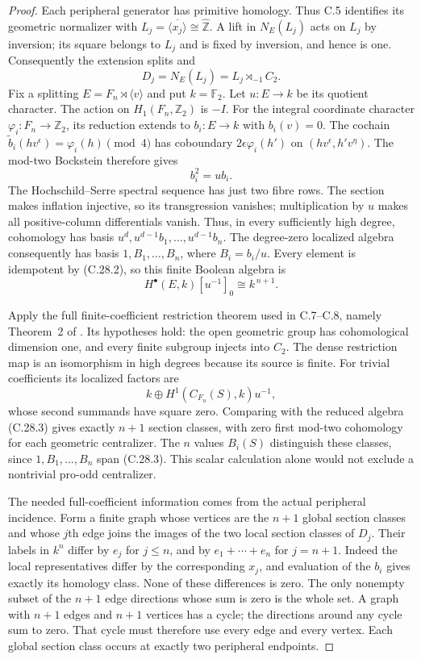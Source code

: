 \documentclass[11pt]{article}
\begin{document}
\begin{proof}
Each peripheral generator has primitive homology.  Thus
C.5 identifies its geometric normalizer with
$L_j=\overline{\langle x_j\rangle}\cong\widehat{\mathbb Z}$.
A lift in $N_E(L_j)$ acts on $L_j$ by inversion; its square
belongs to $L_j$ and is fixed by inversion, and hence is one.
Consequently the extension splits and
\[
               D_j=N_E(L_j)=L_j\rtimes_{-1}C_2.
\]
Fix a splitting $E=F_n\rtimes\langle v\rangle$ and put
$k=\mathbb F_2$.  Let $u:E\to k$ be its quotient character.
The action on $H_1(F_n,\mathbb Z_2)$ is $-I$.  For the
integral coordinate character $\varphi_i:F_n\to\mathbb Z_2$,
its reduction extends to $b_i:E\to k$ with $b_i(v)=0$.
The cochain
$\widetilde b_i(hv^\epsilon)=\varphi_i(h)\pmod4$
has coboundary $2\epsilon\varphi_i(h')$ on
$(hv^\epsilon,h'v^\eta)$.  The mod-two Bockstein therefore
gives
\[
                            b_i^2=ub_i.                 \tag{C.28.2}
\]
The Hochschild--Serre spectral sequence has just two fibre
rows.  The section makes inflation injective, so its
transgression vanishes; multiplication by $u$ makes all
positive-column differentials vanish.  Thus, in every
sufficiently high degree, cohomology has basis
$u^d,u^{d-1}b_1,\ldots,u^{d-1}b_n$.  The degree-zero
localized algebra consequently has basis
$1,B_1,\ldots,B_n$, where $B_i=b_i/u$.  Every element is
idempotent by (C.28.2), so this finite Boolean algebra is
\[
                     H^\bullet(E,k)[u^{-1}]_0
                           \cong k^{\,n+1}.              \tag{C.28.3}
\]

Apply the full finite-coefficient restriction theorem
used in C.7--C.8, namely Theorem~2 of
\cite{CEKochloukovaZalesskii2007}.  Its hypotheses hold:
the open geometric group has cohomological dimension one,
and every finite subgroup injects into $C_2$.  The dense
restriction map is an isomorphism in high degrees because
its source is finite.  For trivial coefficients its
localized factors are
\[
       k\oplus H^1(C_{F_n}(S),k)u^{-1},
\]
whose second summands have square zero.  Comparing with
the reduced algebra (C.28.3) gives exactly $n+1$ section
classes, with zero first mod-two cohomology for each
geometric centralizer.  The $n$ values $B_i(S)$ distinguish
these classes, since $1,B_1,\ldots,B_n$ span (C.28.3).
This scalar calculation alone would not exclude a
nontrivial pro-odd centralizer.

The needed full-coefficient information comes from the
actual peripheral incidence.  Form a finite graph whose
vertices are the $n+1$ global section classes and whose
$j$th edge joins the images of the two local section
classes of $D_j$.  Their labels in $k^n$ differ by
$e_j$ for $j\leq n$, and by $e_1+\cdots+e_n$ for
$j=n+1$.  Indeed the local representatives differ by
the corresponding $x_j$, and evaluation of the $b_i$
gives exactly its homology class.  None of these
differences is zero.  The only nonempty subset of the
$n+1$ edge directions whose sum is zero is the whole
set.  A graph with $n+1$ edges and $n+1$ vertices
has a cycle; the directions around any cycle sum to
zero.  That cycle must therefore use every edge and
every vertex.  Each global section class occurs at
exactly two peripheral endpoints.


\end{proof}
\end{document}
